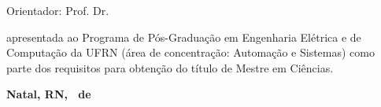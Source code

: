 \begin{titlepage}
\begin{center}

\LARGE
\textbf{\titulo}

\vfill

\Large
\textbf{\autor}

\vfill

\normalsize
Orientador: Prof. Dr. \orientador

\vfill

\hfill
\parbox{0.5\linewidth}{\textbf{\documento} apresentada ao Programa
de Pós-Graduação em Engenharia Elétrica e de Computação da UFRN (área de
concentração: Automação e Sistemas) como parte dos requisitos para obtenção do
título de Mestre em Ciências.}

\vfill

\large
\textbf{Natal, RN, \Mesaprovacao\ de \Anoaprovacao}

\end{center}

\end{titlepage}
